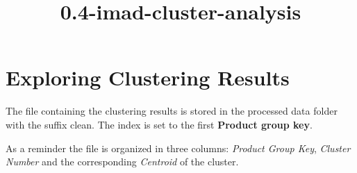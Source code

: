 \documentclass[11pt]{article}
\title{0.4-imad-cluster-analysis}
\begin{document}
    
    
    \maketitle
    
    

    
    \section{Exploring Clustering
Results}\label{exploring-clustering-results}

The file containing the clustering results is stored in the processed
data folder with the suffix clean. The index is set to the first
\textbf{Product group key}.

As a reminder the file is organized in three columns: \emph{Product
Group Key}, \emph{Cluster Number} and the corresponding \emph{Centroid}
of the cluster.
\end{document}
